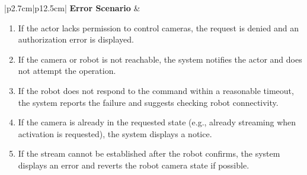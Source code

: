 \begin{table}[H]
\begin{tabular}{|p{2.7cm}|p{12.5cm}|}
\textbf{Error Scenario} &
\begin{minipage}[t]{\linewidth}
\begin{enumerate}[topsep=0pt,itemsep=1pt,parsep=0pt,partopsep=0pt]
\item If the actor lacks permission to control cameras, the request is denied and an authorization error is displayed.
\item If the camera or robot is not reachable, the system notifies the actor and does not attempt the operation.
\item If the robot does not respond to the command within a reasonable timeout, the system reports the failure and suggests checking robot connectivity.
\item If the camera is already in the requested state (e.g., already streaming when activation is requested), the system displays a notice.
\item If the stream cannot be established after the robot confirms, the system displays an error and reverts the robot camera state if possible.
\end{enumerate}
\end{minipage} \\ \hline

\end{tabular}
\label{tab:admin-activate-deactivate-camera}
\end{table}
\fi


